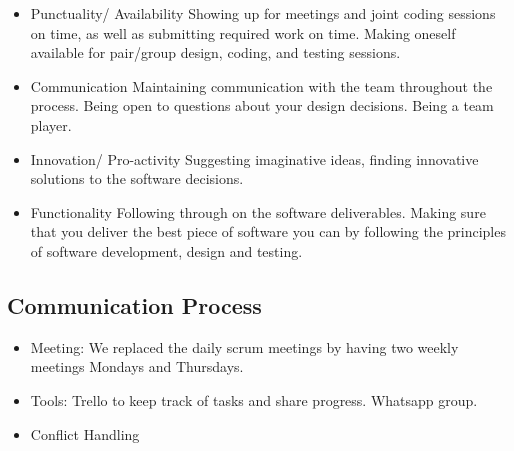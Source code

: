 \documentclass[11pt]{article}
\begin{document}
\begin{itemize}
	\item Punctuality/ Availability
	\subitem Showing up for meetings and joint coding sessions on time, as well as submitting required work on time.
	Making oneself available for pair/group design, coding, and testing sessions.
	
	\item Communication
	\subitem Maintaining communication with the team throughout the process. Being open to questions about your design decisions. Being a team player.
	
	\item Innovation/ Pro-activity
	\subitem Suggesting imaginative ideas, finding innovative solutions to the software decisions.
	
	\item Functionality
	\subitem Following through on the software deliverables. Making sure that you deliver the best piece of software you can by following the principles of software development, design and testing.
\end{itemize}

\subsection{Communication Process}
\begin{itemize}
	\item Meeting: We replaced the daily scrum meetings by having two weekly meetings Mondays and Thursdays.
	\item Tools: Trello to keep track of tasks and share progress. Whatsapp group.
	\item Conflict Handling
\end{itemize}
\end{document}
